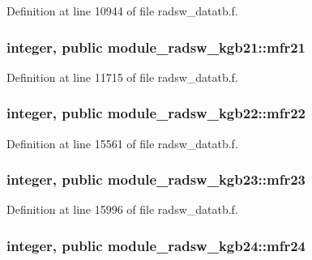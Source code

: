 Definition at line 10944 of file radsw\+\_\+datatb.\+f.

\subsubsection[{\texorpdfstring{mfr21}{mfr21}}]{\setlength{\rightskip}{0pt plus 5cm}integer, public module\+\_\+radsw\+\_\+kgb21\+::mfr21}\hypertarget{group__module__radsw__main_ga5575239aa9d55abcca1ac1f82dc4c4ec}{}\label{group__module__radsw__main_ga5575239aa9d55abcca1ac1f82dc4c4ec}


Definition at line 11715 of file radsw\+\_\+datatb.\+f.

\subsubsection[{\texorpdfstring{mfr22}{mfr22}}]{\setlength{\rightskip}{0pt plus 5cm}integer, public module\+\_\+radsw\+\_\+kgb22\+::mfr22}\hypertarget{group__module__radsw__main_ga0afe8facbe4837a22c96a0d2000a20ee}{}\label{group__module__radsw__main_ga0afe8facbe4837a22c96a0d2000a20ee}


Definition at line 15561 of file radsw\+\_\+datatb.\+f.

\subsubsection[{\texorpdfstring{mfr23}{mfr23}}]{\setlength{\rightskip}{0pt plus 5cm}integer, public module\+\_\+radsw\+\_\+kgb23\+::mfr23}\hypertarget{group__module__radsw__main_ga78b43ec4bc2afd4f520480a8410d9df5}{}\label{group__module__radsw__main_ga78b43ec4bc2afd4f520480a8410d9df5}


Definition at line 15996 of file radsw\+\_\+datatb.\+f.

\subsubsection[{\texorpdfstring{mfr24}{mfr24}}]{\setlength{\rightskip}{0pt plus 5cm}integer, public module\+\_\+radsw\+\_\+kgb24\+::mfr24}\hypertarget{group__module__radsw__main_ga3a1c3808493ce89f2218116a02350e51}{}\label{group__module__radsw__main_ga3a1c3808493ce89f2218116a02350e51}



